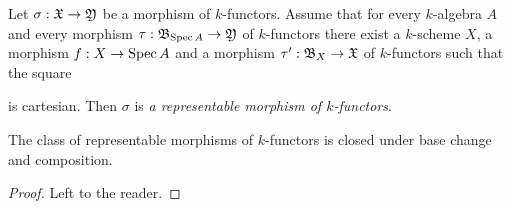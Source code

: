 \begin{definition}
Let $\sigma:{\mathfrak X}\rightarrow {\mathfrak Y}$ be a morphism of $k$-functors. Assume that for every $k$-algebra $A$ and every morphism $\tau:{\mathfrak B}_{\mathrm{Spec}\, A}\rightarrow {\mathfrak Y}$ of $k$-functors there exist a $k$-scheme $X$, a morphism $f:X\rightarrow \mathrm{Spec}\, A$ and a morphism $\tau':{\mathfrak B}_{X}\rightarrow {\mathfrak X}$ of $k$-functors such that the square
\begin{center}
\end{center}
is cartesian. Then $\sigma$ is \textit{a representable morphism of $k$-functors}.
\end{definition}

\begin{fact}\label{fact:representablemorphismsunderbasechangeandcomposition}
The class of representable morphisms of $k$-functors is closed under base change and composition.
\end{fact}
\begin{proof}
Left to the reader.
\end{proof}

